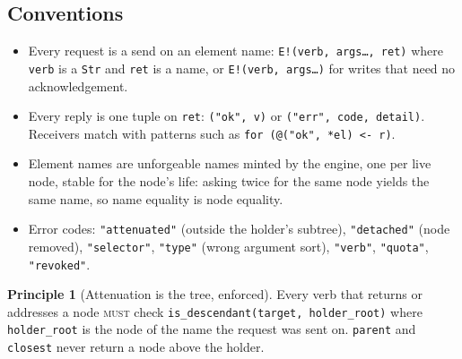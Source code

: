 \documentclass[11pt]{article}
\theoremstyle{definition}
\newtheorem{principle}{Principle}
\theoremstyle{remark}
\newcommand{\MUST}{\textsc{must}}
\newcommand{\code}[1]{\texttt{#1}}
\begin{document}
\subsection{Conventions}\label{sec:proto-conv}
\begin{itemize}[nosep]
\item Every request is a send on an element name: \code{E!(verb, args\ldots, ret)}
  where \code{verb} is a \code{Str} and \code{ret} is a name, or \code{E!(verb,
  args\ldots)} for writes that need no acknowledgement.
\item Every reply is one tuple on \code{ret}: \code{("ok", v)} or
  \code{("err", code, detail)}. Receivers match with patterns such as
  \code{for (@("ok", *el) <- r)}.
\item Element names are unforgeable names minted by the engine, one per live node,
  stable for the node's life: asking twice for the same node yields the same name,
  so name equality is node equality.
\item Error codes: \code{"attenuated"} (outside the holder's subtree),
  \code{"detached"} (node removed), \code{"selector"}, \code{"type"} (wrong argument
  sort), \code{"verb"}, \code{"quota"}, \code{"revoked"}.
\end{itemize}

\begin{principle}[Attenuation is the tree, enforced]
Every verb that returns or addresses a node \MUST{} check
\code{is\_descendant(target, holder\_root)} where \code{holder\_root} is the node of
the name the request was sent on. \code{parent} and \code{closest} never return a node
above the holder.
\end{principle}
\end{document}
